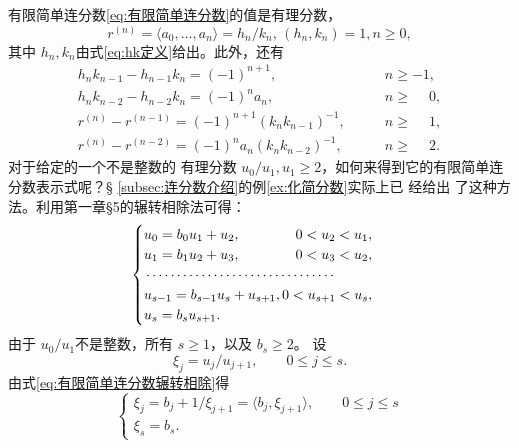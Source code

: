 \begin{theorem}
	有限简单连分数\eqref{eq:有限简单连分数}的值是有理分数，
	\begin{equation}
		r^{(n)} = \langle a_0, \dots, a_n \rangle = h_n/k_n,\, \left(h_n, k_n\right) = 1, n \ge 0,
	\end{equation}
	其中 \( h_n, k_n \)由式\eqref{eq:hk定义}给出。此外，还有
	\begin{align}
		h_nk_{n-1} - h_{n-1}k_n = (-1)^{n+1}, \qquad               & n \ge -1,           \\
		h_nk_{n-2} - h_{n-2}k_n = (-1)^{n}a_n, \qquad              & n \ge \phantom{-}0, \\
		r^{(n)} - r^{(n-1)} = (-1)^{n+1}(k_nk_{n-1})^{-1}, \qquad  & n \ge \phantom{-}1, \\
		r^{(n)} - r^{(n-2)} = (-1)^{n}a_n(k_nk_{n-2})^{-1}, \qquad & n \ge \phantom{-}2.
	\end{align}
	对于给定的一个不是整数的 有理分数 \( u_0 / u_1, u_1 \ge 2 \)，如何来得到它的有限简单连分数表示式呢？\S
	\ref{subsec:连分数介绍}的例\ref{ex:化简分数}实际上已 经给出 了这种方法。利用第一章§5的辗转相除法可得：
	\begin{equation}\label{eq:有限简单连分数辗转相除}
		\begin{cases}
			u_0 = b_0 u_1 + u_2, \hfill              0 < u_2 < u_1,     \\
			u_1 = b_1 u_2 + u_3, \hfill              0 < u_3 < u_2,     \\
			\begin{minipage}{0.4\textwidth}
				\dotfill
			\end{minipage}                              \\
			u_{s-1} = b_{s-1} u_s + u_{s+1}, \hfill  0 < u_{s+1} < u_s, \\
			u_s = b_s u_{s+1}. \hfill
		\end{cases}
	\end{equation}
	由于 \( u_0 / u_1 \)不是整数，所有 \( s \ge 1 \)，以及 \( b_s \ge 2 \)。 设
	\begin{equation}
		\xi_j = u_j / u_{j+1}, \qquad 0 \le j \le s.
	\end{equation}
	由式\eqref{eq:有限简单连分数辗转相除}得
	\begin{equation}
		\begin{cases}
			\xi_j = b_j + 1 / \xi_{j + 1} = \langle b_j, \xi_{j+1} \rangle, \qquad 0 \le j \le s \\
			\xi_s = b_s.
		\end{cases}
	\end{equation}

\end{theorem}
